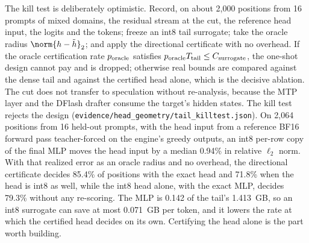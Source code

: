 The kill test is deliberately optimistic. Record, on about 2,000 positions from 16 prompts of mixed domains, the residual stream at the cut, the reference head input, the logits and the tokens; freeze an int8 tail surrogate; take the oracle radius $\norm{h-\tilde h}_2$; and apply the directional certificate with no overhead. If the oracle certification rate $p_{\rm oracle}$ satisfies $p_{\rm oracle}T_{\rm tail}\le C_{\rm surrogate}$, the one-shot design cannot pay and is dropped; otherwise real bounds are compared against the dense tail and against the certified head alone, which is the decisive ablation. The cut does not transfer to speculation without re-analysis, because the MTP layer and the DFlash drafter consume the target's hidden states. The kill test rejects the design (\nolinkurl{evidence/head_geometry/tail_killtest.json}). On 2,064 positions from 16 held-out prompts, with the head input from a reference BF16 forward pass teacher-forced on the engine's greedy outputs, an int8 per-row copy of the final MLP moves the head input by a median 0.94\% in relative $\ell_2$ norm. With that realized error as an oracle radius and no overhead, the directional certificate decides 85.4\% of positions with the exact head and 71.8\% when the head is int8 as well, while the int8 head alone, with the exact MLP, decides 79.3\% without any re-scoring. The MLP is 0.142 of the tail's 1.413~GB, so an int8 surrogate can save at most 0.071~GB per token, and it lowers the rate at which the certified head decides on its own. Certifying the head alone is the part worth building.

